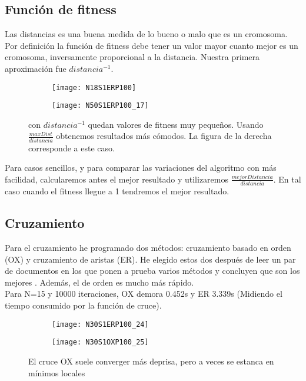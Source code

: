 \documentclass[10pt]{article}
\begin{document}
\subsection{Función de fitness}
Las distancias es una buena medida de lo bueno o malo que es un cromosoma. Por definición la función de fitness debe tener un valor mayor cuanto mejor es un cromosoma, inversamente proporcional a la distancia. Nuestra primera aproximación fue $distancia^{-1}$.
\begin{figure}[h]
		\begin{subfigure}[t]{0.50\textwidth}
			\texttt{[image: N18S1ERP100]}
		\end{subfigure}
		\begin{subfigure}[t]{0.50\textwidth}
			\texttt{[image: N50S1ERP100\_17]}
		\end{subfigure}
	\caption{con $distancia^{-1}$ quedan valores de fitness muy pequeños. Usando $\frac{maxDist}{distancia}$ obtenemos resultados más cómodos. La figura de la derecha corresponde a este caso.}
\end{figure}
Para casos sencillos, y para comparar las variaciones del algoritmo con más facilidad, calcularemos antes el mejor resultado y utilizaremos $\frac{mejorDistancia}{distancia}$. En tal caso cuando el fitness llegue a 1 tendremos el mejor resultado.
\subsection{Cruzamiento}
Para el cruzamiento he programado dos métodos: cruzamiento basado en orden (OX) y cruzamiento de aristas (ER). He elegido estos dos después de leer un par de documentos en los que ponen a prueba varios métodos \cite{jess} y concluyen que son los mejores \cite{larra}. Además, el de orden es mucho más rápido.\\
Para N=15 y 10000 iteraciones, OX demora 0.452s y ER 3.339s (Midiendo el tiempo consumido por la función de cruce).
\begin{figure}[H]
	\begin{subfigure}[H]{0.50\textwidth}
		\texttt{[image: N30S1ERP100\_24]}
	\end{subfigure}
	\begin{subfigure}[H]{0.50\textwidth}
		\texttt{[image: N30S1OXP100\_25]}
	\end{subfigure}
	\caption{El cruce OX suele converger más deprisa, pero a veces se estanca en mínimos locales}
\end{figure}
\end{document}
